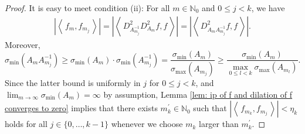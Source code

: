 \documentclass[10pt,a4paper]{amsart}
\newcommand{\N}{\mathbb{N}}
\newcommand{\ip}[1]{\ensuremath{\left<\text{} \, #1 \, \text{}\right>}}
\begin{document}
\begin{proof}
    It is easy to meet condition (ii): For all $m \in \N_0$ and $0\leq j <k$, we have
    \begin{align*}
      \left|\ip{f_m,f_{m_j}}\right|=\left|\ip{D_{A_{m_j}^{-1}}^2D_{A_{m}}^2f,f}\right|
      =\left|\ip{D_{A_{m}A_{m_j}^{-1}}^2f,f}\right|.
    \end{align*}
    Moreover,
    \[\sigma_{\text{min}}\left(A_{m}A_{m_j}^{-1}\right)
    \geq \sigma_{\text{min}}\left(A_m\right) \cdot \sigma_{\text{min}}\left(A_{m_j}^{-1}\right)
    =\frac{\sigma_{\text{min}}\left(A_{m}\right)}{\sigma_{\text{max}}\left(A_{m_j}\right)}
    \geq \frac{\sigma_{\text{min}}\left(A_{m}\right)}{\max_{0\leq l<k}\sigma_{\text{max}}\left(A_{m_l}\right)}.\]
    Since the latter bound is uniformly in $j$ for $0\leq j<k$, and $\lim_{m \to \infty}\sigma_{\text{min}}\left(A_{m}\right)=\infty$ by assumption, Lemma \ref{lem: ip of f and dilation of f converges to zero} implies that there exists $m_k^\prime \in \N_0$ such that $\left|\ip{f_{m_k},f_{m_j}}\right|<\eta_k$ holds for all $j \in \{0,\ldots,k-1\}$ whenever we choose $m_k$ larger than $m_k^\prime$. 
  

\end{proof}
\end{document}
